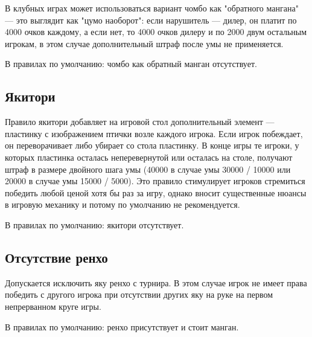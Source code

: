 В клубных играх может использоваться вариант чомбо как "обратного мангана" --- это выглядит как "цумо наоборот": если нарушитель --- дилер, он платит по 4000 очков каждому, а если нет, то 4000 очков дилеру и по 2000 двум остальным игрокам, в этом случае дополнительный штраф после умы не применяется.

В правилах по умолчанию: чомбо как обратный манган отсутствует.

\subsection{Якитори}

Правило якитори добавляет на игровой стол дополнительный элемент --- пластинку с изображением птички возле каждого игрока. Если игрок побеждает, он переворачивает либо убирает со стола пластинку. В конце игры те игроки, у которых пластинка осталась неперевернутой или осталась на столе, получают штраф в размере двойного шага умы (40000 в случае умы 30000 / 10000 или 20000 в случае умы 15000 / 5000). Это правило стимулирует игроков стремиться победить любой ценой хотя бы раз за игру, однако вносит существенные нюансы в игровую механику и потому по умолчанию не рекомендуется.

В правилах по умолчанию: якитори отсутствует.

\subsection{Отсутствие ренхо}

Допускается исключить яку ренхо с турнира. В этом случае игрок не имеет права победить с другого игрока при отсутствии других яку на руке на первом непрерванном круге игры.

В правилах по умолчанию: ренхо присутствует и стоит манган.
